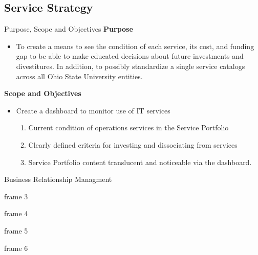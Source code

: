 \documentclass[xcolor=x11names,compress]{beamer}
\renewcommand{\(}{\begin{columns}}
\renewcommand{\)}{\end{columns}}
\newcommand{\<}[1]{\begin{column}{#1}}
\renewcommand{\>}{\end{column}}
\begin{document}
\subsection{Service Strategy}
\begin{frame}{Purpose, Scope and Objectives}
\textbf{Purpose}
\begin{itemize}
	\item To create a means to see the condition of each service, its cost, and funding gap to be able to make educated decisions about future investments and divestitures. In addition, to possibly standardize a single service catalogs across all Ohio State University entities.
\end{itemize}
\textbf{Scope and Objectives}
\begin{itemize}
	\item Create a dashboard to monitor use of IT services
\begin{enumerate}
	\item Current condition of operations services in the Service Portfolio
	\item Clearly defined criteria for investing and dissociating from services
	\item Service Portfolio content translucent and noticeable via the dashboard.
\end{enumerate}
\end{itemize}
\end{frame}
\begin{frame}{Business Relationship Managment}



\end{frame}
\begin{frame}{frame 3}

\end{frame}
\begin{frame}{frame 4}

\end{frame}
\begin{frame}{frame 5}

\end{frame}
\begin{frame}{frame 6}

\end{frame}
\end{document}
